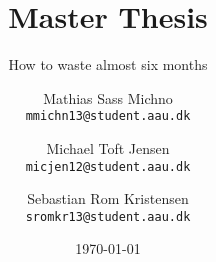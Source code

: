 \newcommand{\TITLE}{Master Thesis}
\newcommand{\SUBTITLE}{How to waste almost six months}
\newcommand{\GROUP}{Yes}
\newcommand{\PERIOD}{Spring semester, 2018}
\newcommand{\MEMBERS}{%
    Mathias Sass Michno\\
    Michael Toft Jensen\\
    Sebastian Rom Kristensen
}
\newcommand{\SUPERVISOR}{Stefan Schmid \& René Rydhof Hansen}
\newcommand{\COMPLETION}{\today}

\title{\TITLE}
\subtitle{\SUBTITLE}
\author{
    Mathias Sass Michno\\
    \texttt{mmichn13@student.aau.dk}
    \and
    Michael Toft Jensen\\
    \texttt{micjen12@student.aau.dk}
    \and
    Sebastian Rom Kristensen\\
    \texttt{sromkr13@student.aau.dk}
}
\date{\today}
